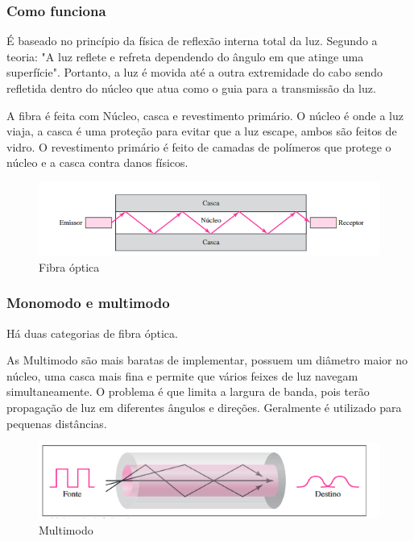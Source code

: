 \documentclass[12pt,a4, oneside, brazil]{article}
\begin{document}
	\subsubsection{Como funciona}
	É baseado no princípio da física de reflexão interna total da luz. Segundo a teoria: "A luz reflete e refreta dependendo do ângulo em que atinge uma superfície". Portanto, a luz é movida até a outra extremidade do cabo sendo refletida dentro do núcleo que atua como o guia para a transmissão da luz.
	
	A fibra é feita com Núcleo, casca e revestimento primário. O núcleo é onde a luz viaja, a casca é uma proteção para evitar que a luz escape, ambos são feitos de vidro. O revestimento primário é feito de camadas de polímeros que protege o núcleo e a casca contra danos físicos. 
	
		
	\begin{figure}[H]
		\centering
		\includegraphics[width=15cm]{fibra-optica}
		\caption{Fibra óptica}
		\label{fig:fibra-optica}
	\end{figure}
	
	\subsubsection{Monomodo e multimodo}
	Há duas categorias de fibra óptica.
	
	As Multimodo são mais baratas de implementar, possuem um diâmetro maior no núcleo, uma casca mais fina e permite que vários feixes de luz navegam simultaneamente. O problema é que limita a largura de banda, pois terão propagação de luz em diferentes ângulos e direções. Geralmente é utilizado para pequenas distâncias.
	
	\begin{figure}[H]
		\centering
		\includegraphics[width=15cm]{multimodo}
		\caption{Multimodo}
		\label{fig:multimodo}
	\end{figure}
	
\end{document}
